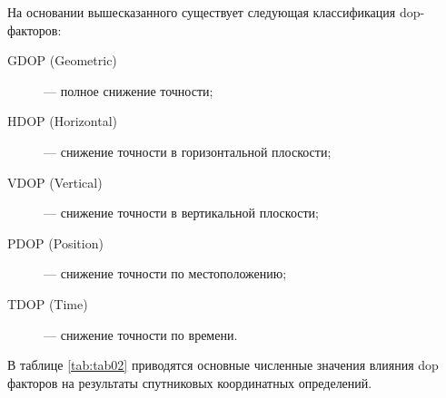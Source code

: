 На основании вышесказанного существует следующая классификация dop-факторов:
\begin{description}
	\item [GDOP (Geometric)] --- полное снижение точности;
	\item [HDOP (Horizontal)] --- снижение точности в горизонтальной плоскости;
	\item [VDOP (Vertical)] --- снижение точности в вертикальной плоскости;
	\item [PDOP (Position)] --- снижение точности по местоположению;
	\item [TDOP (Time)] --- снижение точности по времени.
\end{description}

В таблице \cref{tab:tab02} приводятся основные численные значения влияния dop факторов на результаты спутниковых координатных определений.






